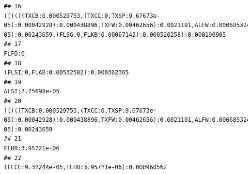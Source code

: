 \documentclass[]{article}
\begin{document}
\begin{verbatim}
## 16                                                                                                                                                                  ((((((TXCB:0.000529753,(TXCC:0,TXSP:9.67673e-05):0.00042928):0.000438896,TXFW:0.00462656):0.0021191,ALFW:0.000685324):0.000140543,LAFW:0.000833551):0.000556541,ALST:7.75698e-05):0.00243659,(FLSG:0,FLKB:0.00067142):0.000520258):0.000190905
## 17                                                                                                                                                                                                                                                                                                                                                                                                          FLFD:0
## 18                                                                                                                                                                                                                                                                                                                                                                            (FLSI:0,FLAB:0.00532582):0.000362365
## 19                                                                                                                                                                                                                                                                                                                                                                                                ALST:7.75698e-05
## 20                                                                                                                                                                                                                     (((((TXCB:0.000529753,(TXCC:0,TXSP:9.67673e-05):0.00042928):0.000438896,TXFW:0.00462656):0.0021191,ALFW:0.000685324):0.000140543,LAFW:0.000833551):0.000556541,ALST:7.75698e-05):0.00243659
## 21                                                                                                                                                                                                                                                                                                                                                                                                FLHB:3.95721e-06
## 22                                                                                                                                                                                                                                                                                                                                                                 (FLCC:9.32244e-05,FLHB:3.95721e-06):0.000960562

\end{verbatim}
\end{document}
